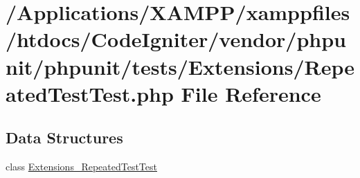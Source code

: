 \hypertarget{_repeated_test_test_8php}{}\section{/\+Applications/\+X\+A\+M\+P\+P/xamppfiles/htdocs/\+Code\+Igniter/vendor/phpunit/phpunit/tests/\+Extensions/\+Repeated\+Test\+Test.php File Reference}
\label{_repeated_test_test_8php}
\subsection*{Data Structures}
\begin{DoxyCompactItemize}
\item 
class \mbox{\hyperlink{class_extensions___repeated_test_test}{Extensions\+\_\+\+Repeated\+Test\+Test}}
\end{DoxyCompactItemize}
